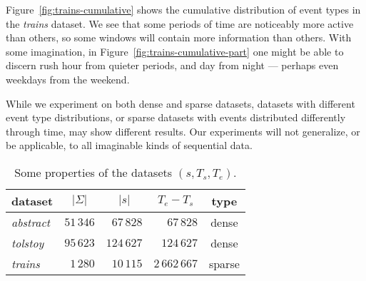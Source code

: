 Figure~\ref{fig:trains-cumulative} shows the cumulative distribution of event types in the \emph{trains} dataset. We see that some periods of time are noticeably more active than others, so some windows will contain more information than others. With some imagination, in Figure~\ref{fig:trains-cumulative-part} one might be able to discern rush hour from quieter periods, and day from night --- perhaps even weekdays from the weekend.

While we experiment on both dense and sparse datasets, datasets with different event type distributions, or sparse datasets with events distributed differently through time, may show different results. Our experiments will not generalize, or be applicable, to all imaginable kinds of sequential data.

\begin{table}[t]
\centering

\begin{tabulary}{\textwidth}{ L|RRRC }

dataset &  &  &  & type \\
\hline
\emph{abstract} & $ 51\,346 $ & $ 67\,828 $ & $ 67\,828 $ & dense \\
\emph{tolstoy} & $ 95\,623 $ & $ 124\,627 $ & $ 124\,627 $ & dense \\
\emph{trains} & $ 1\,280 $ & $ 10\,115 $ & $ 2\,662\,667 $ & sparse \\

\end{tabulary}

\caption{Some properties of the datasets $ (s, T_s, T_e) $.}
\label{table:datasets-numbers}
\end{table}

